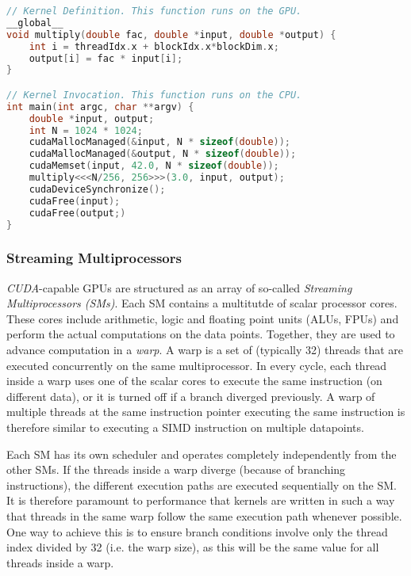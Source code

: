 \begin{lstfloat}
\begin{lstlisting}[caption={Example showing kernel, its launch and CUDA API calls for allocating unified memory},captionpos=b,language=C]
// Kernel Definition. This function runs on the GPU.
__global__
void multiply(double fac, double *input, double *output) {
	int i = threadIdx.x + blockIdx.x*blockDim.x;
	output[i] = fac * input[i];
}

// Kernel Invocation. This function runs on the CPU.
int main(int argc, char **argv) {
	double *input, output;
	int N = 1024 * 1024;
	cudaMallocManaged(&input, N * sizeof(double));
	cudaMallocManaged(&output, N * sizeof(double));
	cudaMemset(input, 42.0, N * sizeof(double));
	multiply<<<N/256, 256>>>(3.0, input, output);
	cudaDeviceSynchronize();
	cudaFree(input);
	cudaFree(output;)
}
\end{lstlisting}
\end{lstfloat}

\subsubsection{Streaming Multiprocessors} \label{sec:hardware}

\emph{CUDA}-capable GPUs are structured as an array of so-called \emph{Streaming Multiprocessors (SMs)}. Each SM contains a multitutde of scalar processor cores. These cores include arithmetic, logic and floating point units (ALUs, FPUs) and perform the actual computations on the data points. Together, they are used to advance computation in a \emph{warp}. A warp is a set of (typically 32) threads that are executed concurrently on the same multiprocessor. In every cycle, each thread inside a warp uses one of the scalar cores to execute the same instruction (on different data), or it is turned off if a branch diverged previously. A warp of multiple threads at the same instruction pointer executing the same instruction is therefore similar to executing a SIMD instruction on multiple datapoints.

Each SM has its own scheduler and operates completely independently from the other SMs. If the threads inside a warp diverge (because of branching instructions), the different execution paths are executed sequentially on the SM. It is therefore paramount to performance that kernels are written in such a way that threads in the same warp follow the same execution path whenever possible. One way to achieve this is to ensure branch conditions involve only the thread index divided by 32 (i.e. the warp size), as this will be the same value for all threads inside a warp. 

